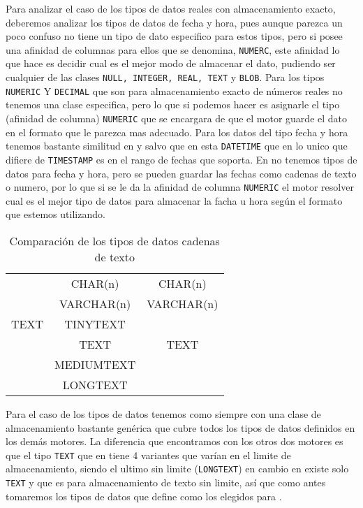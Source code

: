 Para analizar el caso de los tipos de datos reales con almacenamiento exacto, deberemos analizar los tipos de datos de fecha y hora, pues aunque parezca un poco confuso \s no tiene un tipo de dato especifico para estos tipos, pero si posee una afinidad de columnas para ellos que se denomina, \verb=NUMERC=, este afinidad lo que hace es decidir cual es el mejor modo de almacenar el dato, pudiendo ser cualquier de las clases \verb=NULL, INTEGER, REAL, TEXT= y \verb=BLOB=. Para los tipos \verb=NUMERIC= Y \verb=DECIMAL= que son para almacenamiento exacto de números reales no tenemos una clase especifica, pero lo que si podemos hacer es asignarle el tipo (afinidad de columna) \verb=NUMERIC= que se encargara de que el motor guarde el dato en el formato que le parezca mas adecuado. Para los datos del tipo fecha y hora tenemos bastante similitud  en \m y \p salvo que en \m esta \verb=DATETIME= que en lo unico que difiere de \verb=TIMESTAMP= es en el rango de fechas que soporta. En \s no tenemos tipos de datos para fecha y hora, pero se pueden guardar las fechas como cadenas de texto o numero, por lo que si se le da la afinidad de columna \verb=NUMERIC= el motor resolver cual es el mejor tipo de datos para almacenar la facha u hora según el formato que estemos utilizando.   

\begin{table}[h]
\begin{center}
\begin{tabular}{|c|c|c|}
\hline \s & \m & \p \\ 
\hline  & CHAR(n) & CHAR(n) \\  
    & VARCHAR(n) & VARCHAR(n) \\ 
  TEXT   & TINYTEXT &  \\  
    & TEXT & TEXT \\  
    & MEDIUMTEXT &  \\  
    & LONGTEXT &  \\  
\hline 
\end{tabular} 
\end{center}
\caption{Comparación de los tipos de datos cadenas de texto}
\end{table}

Para el caso de los tipos de datos tenemos como siempre \s con una clase de almacenamiento bastante genérica que cubre todos los tipos de datos definidos en los demás motores. La diferencia que encontramos con los otros dos motores es que el tipo \verb=TEXT= que en \m tiene 4 variantes que varían en el limite de almacenamiento, siendo el ultimo sin limite (\verb=LONGTEXT=) en cambio en \p existe solo \verb=TEXT= y que es para almacenamiento de texto sin limite, así que como antes tomaremos los tipos de datos que define \p como los elegidos para \cc. 

